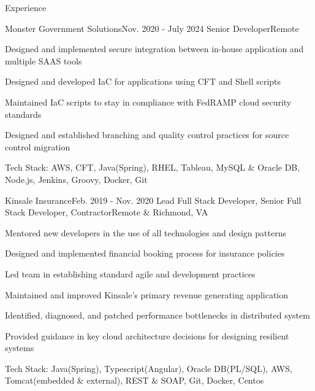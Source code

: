 \documentclass{resume} %
\begin{document}

\begin{rSection}{\vspace{-1em}Experience}

	\begin{rSubsection}{Monster Government Solutions}{Nov. 2020 - July 2024}
			{Senior Developer}{Remote}
		\item Designed and implemented secure integration between in-house application and multiple SAAS tools
		\item Designed and developed IaC for applications using CFT and Shell scripts
		\item Maintained IaC scripts to stay in compliance with FedRAMP cloud security standards
		\item Designed and established branching and quality control practices for source control migration
		\item Tech Stack: AWS, CFT, Java(Spring), RHEL, Tableau, MySQL \& Oracle DB, Node.js, Jenkins, Groovy, Docker, Git
	\end{rSubsection}\vspace{-0.5em}
	
	\begin{rSubsection}{Kinsale Insurance}{Feb. 2019 - Nov. 2020}
			{Lead Full Stack Developer, Senior Full Stack Developer, Contractor}{Remote \& Richmond, VA}
		\item Mentored new developers in the use of all technologies and design patterns
		\item Designed and implemented financial booking process for insurance policies
		\item Led team in establishing standard agile and development practices
	    \item Maintained and improved Kinsale's primary revenue generating application
		\item Identified, diagnosed, and patched performance bottlenecks in distributed system
		\item Provided guidance in key cloud architecture decisions for designing resilient systems
		\item Tech Stack: Java(Spring), Typescript(Angular), Oracle DB(PL/SQL), AWS, Tomcat(embedded \& external), REST \& SOAP, Git, Docker, Centos
	\end{rSubsection}\vspace{-0.5em}



\end{rSection}
\end{document}
